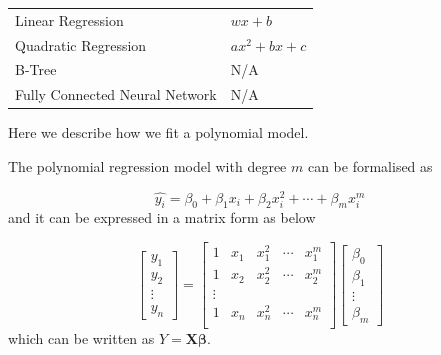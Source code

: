 \begin{table}[h]
  \begin{tabularx}{\textwidth}{@{}XX@{}}
  \toprule
    Linear Regression & $wx+b$ \\
    Quadratic Regression & $ax^2+bx+c$ \\
    B-Tree & N/A \\
    Fully Connected Neural Network & N/A \\
  \bottomrule
  \end{tabularx}
  \end{table}

Here we describe how we fit a polynomial model.

The polynomial regression model with degree $m$ can be formalised as 

$$ \hat{y_i}= \beta_0+\beta_1x_i+\beta_2x_i^2+\cdots+\beta_mx_i^m$$ and it can be expressed in a matrix form as below

$$
\begin{bmatrix}
y_1 \\ y_2\\ \vdots \\ y_n 
\end{bmatrix}=\begin{bmatrix}
1 & x_1 & x_1^2 &\cdots & x_1^m \\ 
1 & x_2 & x_2^2 &\cdots & x_2^m \\ 
\vdots \\ 
1 & x_n & x_n^2 &\cdots & x_n^m \\ 
\end{bmatrix}\begin{bmatrix}
\beta_0 \\ \beta_1 \\ \vdots \\ \beta_m 
\end{bmatrix}
$$ which can be written as $Y=\boldsymbol{X}\boldsymbol{\beta}$. 
 
